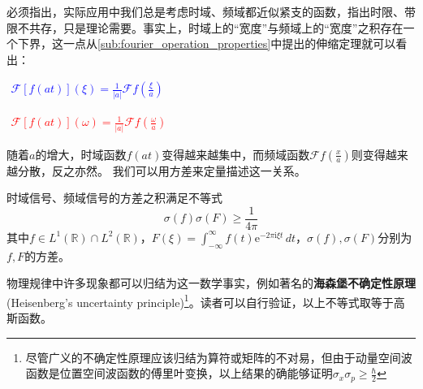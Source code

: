 \documentclass{ctexbook}
\newcommand{\lr}[2]{%
    \begin{center}
    \begin{minipage}[t]{0.45\textwidth}
        \centering
        \allowdisplaybreaks
        \textcolor{blue}{%
            \begin{varwidth}{\linewidth}
            $\begin{aligned}
            #1
            \end{aligned}$
            \end{varwidth}
        }
    \end{minipage}
    \hfill
    \begin{minipage}[t]{0.45\textwidth}
        \centering
        \allowdisplaybreaks
        \textcolor{red}{%
            \begin{varwidth}{\linewidth}
            $\begin{aligned}
            #2
            \end{aligned}$
            \end{varwidth}
        }
    \end{minipage}
\end{center}
}
\begin{document}
必须指出，实际应用中我们总是考虑时域、频域都近似紧支的函数，指出时限、带限不共存，只是理论需要。事实上，时域上的“宽度”与频域上的“宽度”之积存在一个下界，这一点从\ref{sub:fourier_operation_properties}中提出的伸缩定理就可以看出：
\lr{
    \mathcal{F} [f(at)](\xi)=\frac{1}{|a|}\mathcal{F} f\left(\frac{\xi}{a}\right)
}{
    \mathcal{F} [f(at)](\omega)=\frac{1}{|a|}\mathcal{F} f\left(\frac{\omega}{a}\right)
}
随着$a$的增大，时域函数$f(at)$变得越来越集中，而频域函数$\mathcal{F} f\left(\frac{x}{a}\right)$则变得越来越分散，反之亦然。
我们可以用方差来定量描述这一关系。
\begin{theorem}
    时域信号、频域信号的方差之积满足不等式
    \[\sigma(f)\sigma(F)\geq \frac{1}{4\pi}\]
    其中$f\in L^1(\mathbb{R} )\cap L^2(\mathbb{R} )$，$F(\xi)=\int_{-\infty}^{\infty}f(t)\mathrm{e}^{-2\pi \mathrm{i}\xi t}\,dt$，$\sigma(f),\sigma(F)$分别为$f,F$的方差。
\end{theorem}
物理规律中许多现象都可以归结为这一数学事实，例如著名的\textbf{海森堡不确定性原理} (Heisenberg's uncertainty principle)\footnote{尽管广义的不确定性原理应该归结为算符或矩阵的不对易，但由于动量空间波函数是位置空间波函数的傅里叶变换，以上结果的确能够证明$\sigma_x \sigma_p\geq\frac{\hbar}{2}$}。读者可以自行验证，以上不等式取等于高斯函数。
\end{document}
